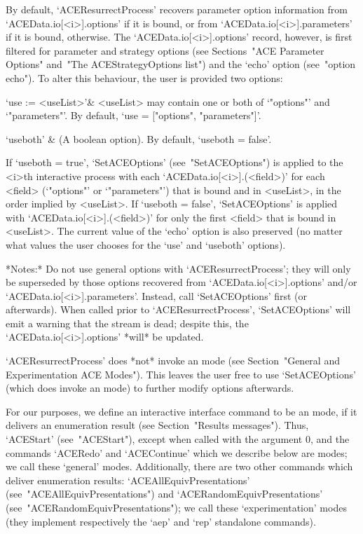 By   default,   `ACEResurrectProcess'   recovers   parameter    option
information from `ACEData.io[<i>].options' if it  is  bound,  or  from
`ACEData.io[<i>].parameters'  if   it   is   bound,   otherwise.   The
`ACEData.io[<i>].options'  record,  however,  is  first  filtered  for
parameter and strategy options (see Sections~"ACE  Parameter  Options"
and~"The ACEStrategyOptions list") and the `echo' option  (see~"option
echo"). To alter this behaviour, the user is provided two options:

\beginitems

\quad`use := <useList>'& <useList>  may   contain   one  or  both   of
`"options"'  and  `"parameters"'.  By  default,  `use  =   ["options",
"parameters"]'.

\quad`useboth' & (A boolean option). By default, `useboth = false'.

\enditems

If `useboth = true', `SetACEOptions' (see~"SetACEOptions") is  applied
to    the    <i>th    interactive    {\ACE}    process    with    each
`ACEData.io[<i>].(<field>)'   for   each   <field>   (`"options"'   or
`"parameters"') that is bound and in <useList>, in the  order  implied
by <useList>. If `useboth = false', `SetACEOptions'  is  applied  with
`ACEData.io[<i>].(<field>)' for only the first <field> that  is  bound
in <useList>. The current value of the `echo' option is also preserved
(no matter what values the user chooses for the  `use'  and  `useboth'
options).

*Notes:*
Do not use general {\ACE}  options  with  `ACEResurrectProcess';  they
will  only   be   superseded   by   those   options   recovered   from
`ACEData.io[<i>].options'     and/or     `ACEData.io[<i>].parameters'.
Instead, call `SetACEOptions' first (or afterwards). When called prior
to `ACEResurrectProcess', `SetACEOptions' will emit a warning that the
stream is dead; despite this, the `ACEData.io[<i>].options' *will*  be
updated.

`ACEResurrectProcess'  does  *not*  invoke   an   {\ACE}   mode   (see
Section~"General and Experimentation ACE Modes"). This leaves the user
free to use `SetACEOptions' (which does  invoke  an  {\ACE}  mode)  to
further modify options afterwards.

\enditems


For our purposes, we define an interactive {\ACE} interface command to
be  an  {\ACE}  mode,  if  it  delivers  an  enumeration  result  (see
Section~"Results messages"). Thus, `ACEStart' (see~"ACEStart"), except
when called with the  argument  0,  and  the  commands  `ACERedo'  and
`ACEContinue' which we describe below are {\ACE} modes; we call  these
\lq{}general' {\ACE} modes. Additionally, there are two other commands
which   deliver   enumeration   results:    `ACEAllEquivPresentations'
(see~"ACEAllEquivPresentations")   and   `ACERandomEquivPresentations'
(see~"ACERandomEquivPresentations");       we        call        these
\lq{}experimentation' {\ACE} modes (they  implement  respectively  the
`aep' and `rep' {\ACE} standalone commands).


